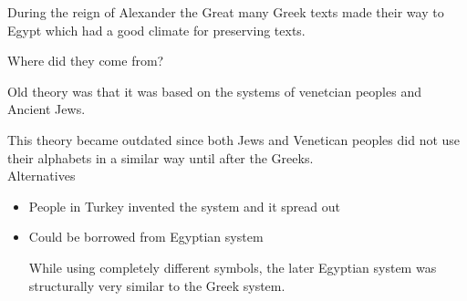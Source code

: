 \documentclass{report}
\begin{document}
\begin{description}
\begin{mdframed}
            During the reign of Alexander the Great many Greek
            texts made their way to Egypt which had a good
            climate for preserving texts.
        \end{mdframed}
        \begin{mdframed}
            Where did they come from?
            \begin{mdframed}
                Old theory was that it was based on the
                systems of venetcian peoples and
                Ancient Jews.
            \end{mdframed}
            This theory became outdated since both Jews and
            Venetican peoples did not use their alphabets in
            a similar way until after the Greeks.
            \\
            Alternatives
            \begin{itemize}
                \item People in Turkey invented the system and
                    it spread out
                \item Could be borrowed from Egyptian system
                    \begin{mdframed}
                        While using completely different
                        symbols, the later Egyptian
                        system was structurally very
                        similar to the Greek system.
                    \end{mdframed}
            \end{itemize}
        \end{mdframed}
\end{description}
\end{document}
